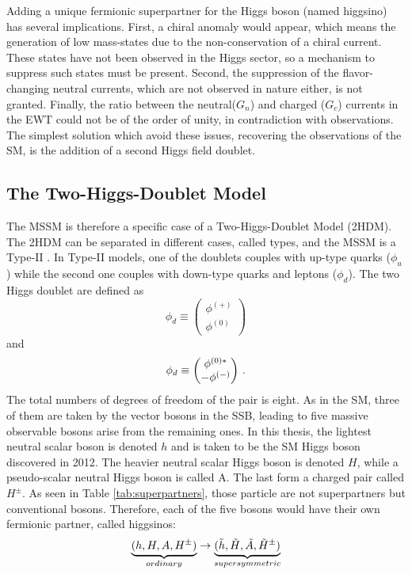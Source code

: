 Adding a unique fermionic superpartner for the Higgs boson (named higgsino) has several implications. First, a chiral anomaly would appear, which means the generation of low mass-states due to the non-conservation of a chiral current. These states have not been observed in the Higgs sector, so a mechanism to suppress such states must be present. Second, the suppression of the flavor-changing neutral currents, which are not observed in nature either, is not granted. Finally, the ratio between the neutral($G_n$) and charged ($G_c$) currents in the EWT could not be of the order of unity, in contradiction with observations. The simplest solution which avoid these issues, recovering the observations of the SM, is the addition of a second Higgs field doublet. 

\subsection{The Two-Higgs-Doublet Model}

The MSSM is therefore a specific case of a Two-Higgs-Doublet Model (2HDM). The 2HDM can be separated in different cases, called types, and the MSSM is a Type-II \cite{Gunion:425736,PhysRevD.41.3421}. In Type-II models, one of the doublets couples with up-type quarks ($\phi_u$) while the second one couples with down-type quarks and leptons ($\phi_d$). The two Higgs doublet are defined as
\begin{equation}
    \phi_d \equiv \begin{pmatrix} \phi^{(+)} \\ \phi^{(0)} \end{pmatrix}
\end{equation}
and
\begin{equation}
    \phi_d \equiv \begin{pmatrix} \phi^{(0)*} \\ -\phi^{(-)} \end{pmatrix} \mend
\end{equation}
The total numbers of degrees of freedom of the pair is eight. As in the SM, three of them are taken by the vector bosons in the SSB, leading to five massive observable bosons arise from the remaining ones. In this thesis, the lightest neutral scalar boson is denoted $h$ and is taken to be the SM Higgs boson discovered in 2012. The heavier neutral scalar Higgs boson is denoted $H$, while a pseudo-scalar neutral Higgs boson is called A. The last form a charged pair called $H^{\pm}$. As seen in Table \ref{tab:superpartners}, those particle are not superpartners but conventional bosons. Therefore, each of the five bosons would have their own fermionic partner, called higgsinos:
\begin{equation}
    \underbrace{(h, H, A, H^{\pm})}_{ordinary} \rightarrow \underbrace{(\Tilde{h}, \Tilde{H}, \Tilde{A}, \Tilde{H}^{\pm})}_{supersymmetric}
\end{equation}

